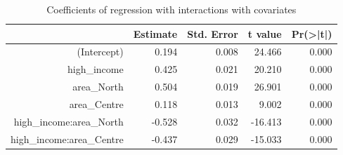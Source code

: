 \begin{table}[ht]
\centering
\begin{tabular}{rrrrr}
  \hline
 & Estimate & Std. Error & t value & Pr(>|t|) \\ 
  \hline
(Intercept) & 0.194 & 0.008 & 24.466 & 0.000 \\ 
  high\_income & 0.425 & 0.021 & 20.210 & 0.000 \\ 
  area\_North & 0.504 & 0.019 & 26.901 & 0.000 \\ 
  area\_Centre & 0.118 & 0.013 & 9.002 & 0.000 \\ 
  high\_income:area\_North & -0.528 & 0.032 & -16.413 & 0.000 \\ 
  high\_income:area\_Centre & -0.437 & 0.029 & -15.033 & 0.000 \\ 
   \hline
\end{tabular}
\caption{Coefficients of regression with interactions with covariates} 
\label{tab:interaction-regression}
\end{table}
